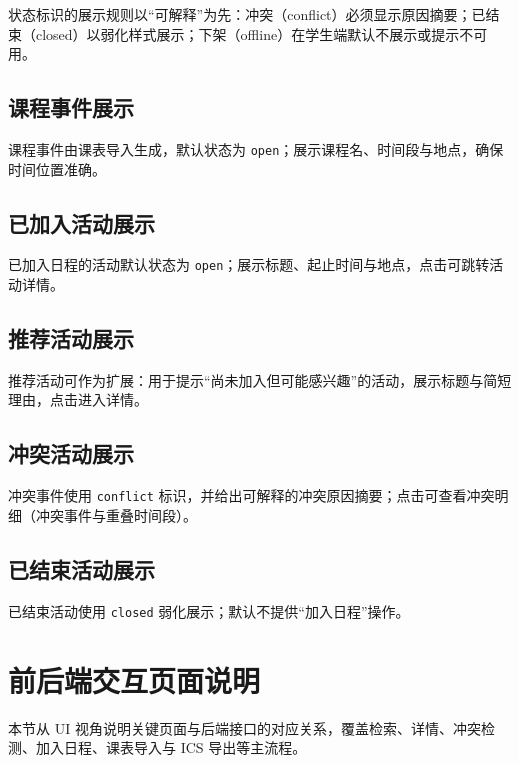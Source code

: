 \documentclass[UTF8,a4paper,12pt,fontset=none]{ctexrep}
\begin{document}
状态标识的展示规则以``可解释''为先：冲突（conflict）必须显示原因摘要；已结束（closed）以弱化样式展示；下架（offline）在学生端默认不展示或提示不可用。

\subsection{课程事件展示}\label{ux8bfeux7a0bux4e8bux4ef6ux5c55ux793a}

课程事件由课表导入生成，默认状态为 \texttt{open}；展示课程名、时间段与地点，确保时间位置准确。

\subsection{已加入活动展示}\label{ux5df2ux52a0ux5165ux6d3bux52a8ux5c55ux793a}

已加入日程的活动默认状态为 \texttt{open}；展示标题、起止时间与地点，点击可跳转活动详情。

\subsection{推荐活动展示}\label{ux63a8ux8350ux6d3bux52a8ux5c55ux793a}

推荐活动可作为扩展：用于提示``尚未加入但可能感兴趣''的活动，展示标题与简短理由，点击进入详情。

\subsection{冲突活动展示}\label{ux51b2ux7a81ux6d3bux52a8ux5c55ux793a}

冲突事件使用 \texttt{conflict} 标识，并给出可解释的冲突原因摘要；点击可查看冲突明细（冲突事件与重叠时间段）。

\subsection{已结束活动展示}\label{ux5df2ux7ed3ux675fux6d3bux52a8ux5c55ux793a}

已结束活动使用 \texttt{closed} 弱化展示；默认不提供``加入日程''操作。

\section{前后端交互页面说明}\label{ux524dux540eux7aefux4ea4ux4e92ux9875ux9762ux8bf4ux660e}

本节从 UI 视角说明关键页面与后端接口的对应关系，覆盖检索、详情、冲突检测、加入日程、课表导入与 ICS 导出等主流程。
\end{document}
